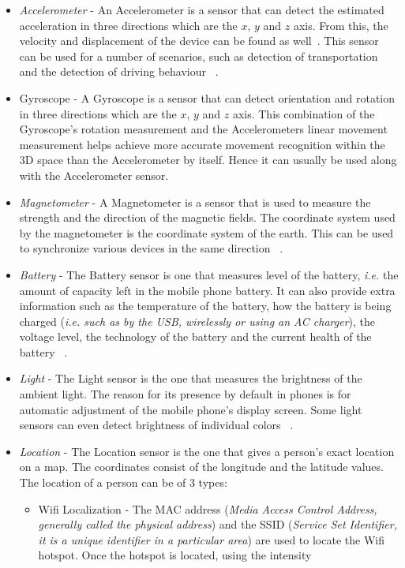 \begin{itemize}
\item {\it Accelerometer} -  An Accelerometer is a sensor that can detect the estimated acceleration in three directions which
are the $x$, $y$ and $z$ axis. From this, the velocity and displacement of the device can be found as well~\cite{accintro}. This sensor
can be used for a number of scenarios, such as detection of transportation ~\cite{accappl1} and the detection of driving behaviour ~\cite{accappl2}.
\item Gyroscope - A Gyroscope is a sensor that can detect orientation and rotation in three directions which
are the $x$, $y$ and $z$ axis. This combination of the Gyroscope's rotation measurement and the Accelerometers linear movement measurement helps achieve more accurate movement recognition within the 3D space than the Accelerometer by
itself. Hence it can usually be used along with the Accelerometer sensor.
\item {\it Magnetometer} - A Magnetometer is a sensor that is used to measure the strength and the direction of the magnetic fields. The coordinate
system used by the magnetometer is the coordinate system of the earth. This can be used to synchronize various devices in the same direction ~\cite{magneintro}.  
\item {\it Battery} - The Battery sensor is one that measures level of the battery, {\it i.e.} the amount of capacity left in the mobile phone
battery. It can also provide extra information such as the temperature of the battery, how the battery is being charged ({\it i.e. such as by the USB,
wirelessly or using an AC charger}), the voltage level, the technology of the battery and the current health of the battery ~\cite{battintro}.
\item {\it Light} - The Light sensor is the one that measures the brightness of the ambient light. The reason for its presence by default in phones
is for automatic adjustment of the mobile phone's display screen. Some light sensors can even detect brightness of individual colors
~\cite{lightintro}.
\item {\it Location} - The Location sensor is the one that gives a person's exact location 
on a map. The coordinates consist of the longitude and the latitude values. The location of a person can be of 3 types:
\begin{itemize}
\item Wifi Localization - The MAC address ({\it Media Access Control Address, generally called the physical address}) and the SSID ({\it Service Set Identifier, it is a unique identifier in a particular area}) are used to locate the Wifi hotspot. Once the hotspot is located, using the intensity

\end{itemize}
\end{itemize}
